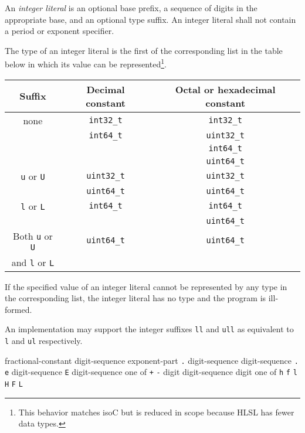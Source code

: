 \p An \textit{integer literal} is an optional base prefix, a sequence of digits
in the appropriate base, and an optional type suffix. An integer literal shall
not contain a period or exponent specifier.

\p The type of an integer literal is the first of the corresponding list in the
table below in which its value can be represented\footnote{This behavior matches
\gls{isoC} but is reduced in scope because HLSL has fewer data types.}.

\begin{center}
  \begin{tabular}{|| c | c | c ||}
    \hline
    Suffix & Decimal constant & Octal or hexadecimal constant \\
    \hline
    \hline
    none & \texttt{int32\_t} & \texttt{int32\_t} \\
         & \texttt{int64\_t} & \texttt{uint32\_t} \\
         &         & \texttt{int64\_t} \\
         &         & \texttt{uint64\_t} \\
    \hline
    \texttt{u} or \texttt{U} & \texttt{uint32\_t} & \texttt{uint32\_t} \\
                             & \texttt{uint64\_t} & \texttt{uint64\_t} \\
    \hline
    \texttt{l} or \texttt{L} & \texttt{int64\_t} & \texttt{int64\_t} \\
                             &  & \texttt{uint64\_t} \\
    \hline
    Both \texttt{u} or \texttt{U} & \texttt{uint64\_t} & \texttt{uint64\_t} \\
    and \texttt{l} or \texttt{L}  &  &  \\
    \hline
  \end{tabular}
\end{center}

\p If the specified value of an integer literal cannot be represented by any
type in the corresponding list, the integer literal has no type and the program
is ill-formed.

\p An implementation may support the integer suffixes \texttt{ll} and
\texttt{ull} as equivalent to \texttt{l} and \texttt{ul} respectively.



\begin{grammar}
  \br
  fractional-constant  \br
  digit-sequence exponent-part \br
  \br
   \texttt{.} digit-sequence\br
  digit-sequence \texttt{.}\br
  \br
  \texttt{e}  digit-sequence\br
  \texttt{E}  digit-sequence\br
   \textnormal{one of}\br
  \texttt{+} \texttt{-}\br
  \br
  digit\br
  digit-sequence digit
   \textnormal{one of}
  \texttt{h} \texttt{f} \texttt{l} \texttt{H} \texttt{F} \texttt{L}
\end{grammar}

